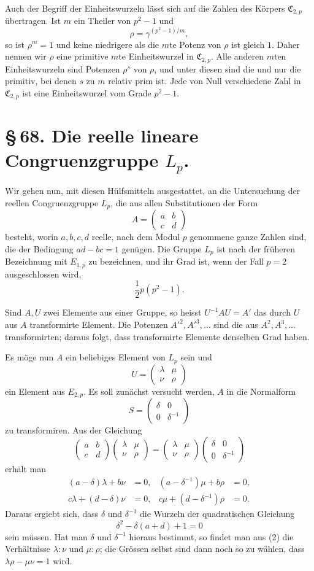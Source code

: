 \documentclass[11pt]{article}
\providecommand{\mat}[4]{\begin{pmatrix}#1&#2\\#3&#4\end{pmatrix}}
\providecommand{\mat}[4]{\begin{pmatrix}#1&#2\\#3&#4\end{pmatrix}}
\providecommand{\Cfield}{\mathfrak C}
\providecommand{\mat}[1]{\begin{pmatrix}#1\end{pmatrix}}
\begin{document}
Auch der Begriff der Einheitswurzeln lässt sich auf die Zahlen des Körpers $\Cfield_{2,p}$ übertragen. Ist $m$ ein Theiler von $p^2-1$ und
\[
 \rho=\gamma^{(p^2-1)/m},
\]
so ist $\rho^m=1$ und keine niedrigere als die $m$te Potenz von $\rho$ ist gleich $1$. Daher nennen wir $\rho$ eine primitive $m$te Einheitswurzel in $\Cfield_{2,p}$. Alle anderen $m$ten Einheitswurzeln sind Potenzen $\rho^s$ von $\rho$, und unter diesen sind die und nur die primitiv, bei denen $s$ zu $m$ relativ prim ist. Jede von Null verschiedene Zahl in $\Cfield_{2,p}$ ist eine Einheitswurzel vom Grade $p^2-1$.

\section*{\S\,68. Die reelle lineare Congruenzgruppe $L_p$.}

Wir gehen nun, mit diesen Hülfsmitteln ausgestattet, an die Untersuchung der reellen Congruenzgruppe $L_p$, die aus allen Substitutionen der Form
\[
 A=\mat{a}{b}{c}{d}
\]
besteht, worin $a,b,c,d$ reelle, nach dem Modul $p$ genommene ganze Zahlen sind, die der Bedingung $ad-bc=1$ genügen. Die Gruppe $L_p$ ist nach der früheren Bezeichnung mit $E_{1,p}$ zu bezeichnen, und ihr Grad ist, wenn der Fall $p=2$ ausgeschlossen wird,
\[
 \frac12 p(p^2-1).
\]

Sind $A,U$ zwei Elemente aus einer Gruppe, so heisst $U^{-1}AU=A'$ das durch $U$ aus $A$ transformirte Element. Die Potenzen $A'^2,A'^3,\ldots$ sind die aus $A^2,A^3,\ldots$ transformirten; daraus folgt, dass transformirte Elemente denselben Grad haben.

Es möge nun $A$ ein beliebiges Element von $L_p$ sein und
\[
 U=\mat{\lambda}{\mu}{\nu}{\rho}
\]
ein Element aus $E_{2,p}$. Es soll zunächst versucht werden, $A$ in die Normalform
\begin{equation}
 S=\mat{\delta}{0}{0}{\delta^{-1}}
 \tag{1}
\end{equation}
zu transformiren. Aus der Gleichung
\[
 \mat{a}{b}{c}{d}\mat{\lambda}{\mu}{\nu}{\rho}
 =\mat{\lambda}{\mu}{\nu}{\rho}\mat{\delta}{0}{0}{\delta^{-1}}
\]
erhält man
\begin{equation}
\begin{aligned}
 (a-\delta)\lambda+b\nu&=0,&
 (a-\delta^{-1})\mu+b\rho&=0,\\
 c\lambda+(d-\delta)\nu&=0,&
 c\mu+(d-\delta^{-1})\rho&=0.
\end{aligned}
\tag{2}
\end{equation}
Daraus ergiebt sich, dass $\delta$ und $\delta^{-1}$ die Wurzeln der quadratischen Gleichung
\begin{equation}
 \delta^2-\delta(a+d)+1=0
 \tag{3}
\end{equation}
sein müssen. Hat man $\delta$ und $\delta^{-1}$ hieraus bestimmt, so findet man aus (2) die Verhältnisse $\lambda:\nu$ und $\mu:\rho$; die Grössen selbst sind dann noch so zu wählen, dass $\lambda\rho-\mu\nu=1$ wird.
\end{document}
